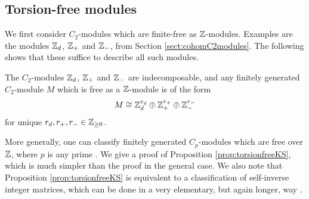 \subsection{Torsion-free modules}

We first consider $C_2$-modules which are finite-free as ${\mathbb Z}$-modules. Examples are the modules ${\mathbb Z}_d$, ${\mathbb Z}_+$ and ${\mathbb Z}_-$, from Section \ref{sect:cohomC2modules}. The following shows that these suffice to describe all such modules.

\begin{prop}\label{prop:torsionfreeKS}
  The $C_2$-modules ${\mathbb Z}_d$, ${\mathbb Z}_+$ and ${\mathbb Z}_-$ are indecomposable, and any finitely generated $C_2$-module $M$ which is free as a ${\mathbb Z}$-module is of the form
  \[
    M \cong {\mathbb Z}_d^{r_d} \oplus {\mathbb Z}_{+}^{r_+} \oplus {\mathbb Z}_{-}^{r_-}
  \]
  for unique $r_d, r_+, r_- \in {\mathbb Z}_{\geq 0}$. 
\end{prop}

More generally, one can classify finitely generated $C_p$-modules which are free over ${\mathbb Z}$, where $p$ is any prime \cite[Thm.\ 74.3, Ex.\ 74(4)]{CR0}. We give a proof of Proposition \ref{prop:torsionfreeKS}, which is much simpler than the proof in the general case. We also note that Proposition \ref{prop:torsionfreeKS} is equivalent to a classification of self-inverse integer matrices, which can be done in a very elementary, but again longer, way \cite{Han}.

